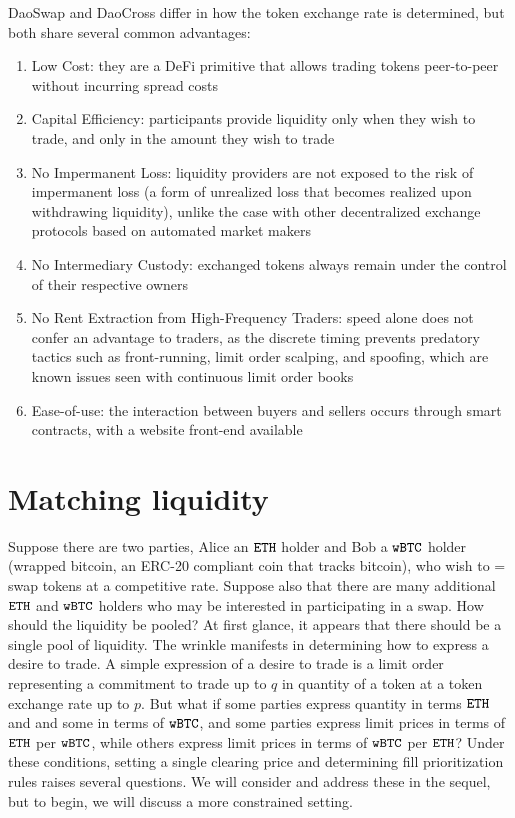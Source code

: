 \documentclass[11pt, reqno]{amsart}
\newcommand{\BTC}{\textnormal{\texttt{wBTC}}}
\newcommand{\ETH}{\textnormal{\texttt{ETH}}}
\begin{document}
DaoSwap and DaoCross differ in how the token exchange rate is determined, but
both share several common advantages:
\begin{enumerate}
	\item Low Cost:
	      they are a DeFi primitive that allows trading tokens peer-to-peer
	      without incurring spread costs
	\item Capital Efficiency:
	      participants provide liquidity only when
	      they wish to trade, and only in the amount they wish to trade
	\item No Impermanent Loss:
	      liquidity providers are not exposed to the risk of impermanent loss
	      (a form of unrealized loss that becomes realized upon withdrawing
	      liquidity), unlike the case with other decentralized exchange protocols
	      based on automated market makers
	\item No Intermediary Custody:
	      exchanged tokens always remain under the control of their respective
	      owners
	\item No Rent Extraction from High-Frequency Traders:
	      speed alone does not confer an advantage to traders, as the discrete
	      timing prevents predatory tactics such as front-running, limit order
	      scalping, and spoofing, which are known issues seen with continuous
	      limit order books
	\item Ease-of-use: the interaction between buyers and sellers occurs
	      through smart contracts, with a website front-end available
\end{enumerate}


\section{Matching liquidity}
Suppose there are two parties, Alice an $\ETH$ holder and Bob a $\BTC$ holder
(wrapped bitcoin, an ERC-20 compliant coin that tracks bitcoin), who wish to =
swap tokens at a competitive rate. Suppose also that there are many
additional $\ETH$ and $\BTC$ holders who may be interested in participating in a
swap. How should the liquidity be pooled? At first glance, it appears that
there should be a single pool of liquidity. The wrinkle manifests in determining
how to express a desire to trade. A simple expression of a desire to trade is
a limit order representing a commitment to trade up to $q$ in quantity of
a token at a token exchange rate up to $p$. But what if some parties express
quantity in terms $\ETH$ and and some in terms of $\BTC$, and some parties
express limit prices in terms of $\ETH$ per $\BTC$, while others express limit
prices in terms of $\BTC$ per $\ETH$? Under these conditions, setting a single
clearing price and determining fill prioritization rules raises several
questions. We will consider and address these in the sequel, but to begin, we
will discuss a more constrained setting.
\end{document}
